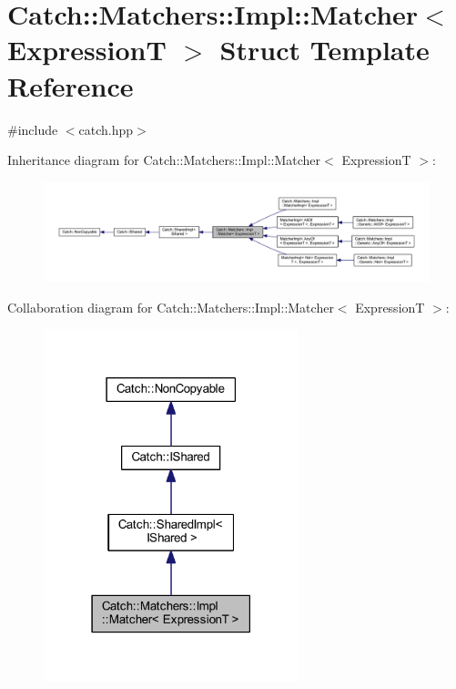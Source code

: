 \hypertarget{struct_catch_1_1_matchers_1_1_impl_1_1_matcher}{}\section{Catch\+:\+:Matchers\+:\+:Impl\+:\+:Matcher$<$ ExpressionT $>$ Struct Template Reference}
\label{struct_catch_1_1_matchers_1_1_impl_1_1_matcher}


{\ttfamily \#include $<$catch.\+hpp$>$}



Inheritance diagram for Catch\+:\+:Matchers\+:\+:Impl\+:\+:Matcher$<$ ExpressionT $>$\+:\nopagebreak
\begin{figure}[H]
\begin{center}
\leavevmode
\includegraphics[width=350pt]{struct_catch_1_1_matchers_1_1_impl_1_1_matcher__inherit__graph}
\end{center}
\end{figure}


Collaboration diagram for Catch\+:\+:Matchers\+:\+:Impl\+:\+:Matcher$<$ ExpressionT $>$\+:\nopagebreak
\begin{figure}[H]
\begin{center}
\leavevmode
\includegraphics[width=210pt]{struct_catch_1_1_matchers_1_1_impl_1_1_matcher__coll__graph}
\end{center}
\end{figure}
